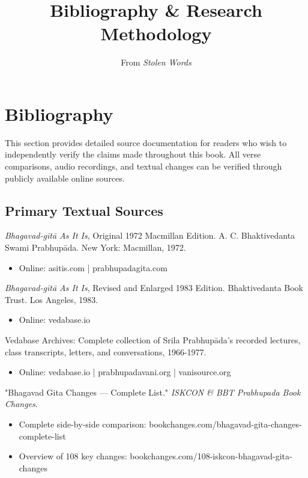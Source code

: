 \documentclass[12pt]{article}
\title{Bibliography \& Research Methodology}
\author{From \textit{Stolen Words}}
\date{}
\begin{document}
\maketitle

\section*{Bibliography}

This section provides detailed source documentation for readers who wish to independently verify the claims made throughout this book. All verse comparisons, audio recordings, and textual changes can be verified through publicly available online sources.

\vspace{0.5cm}

\subsection*{Primary Textual Sources}

\textit{Bhagavad-gītā As It Is}, Original 1972 Macmillan Edition. A. C. Bhaktivedanta Swami Prabhupāda. New York: Macmillan, 1972.
\begin{itemize}
\item Online: asitis.com | prabhupadagita.com
\end{itemize}

\textit{Bhagavad-gītā As It Is}, Revised and Enlarged 1983 Edition. Bhaktivedanta Book Trust. Los Angeles, 1983.
\begin{itemize}
\item Online: vedabase.io
\end{itemize}

Vedabase Archives: Complete collection of Srila Prabhupāda's recorded lectures, class transcripts, letters, and conversations, 1966-1977.
\begin{itemize}
\item Online: vedabase.io | prabhupadavani.org | vanisource.org
\end{itemize}

"Bhagavad Gita Changes — Complete List." \textit{ISKCON \& BBT Prabhupada Book Changes}.
\begin{itemize}
\item Complete side-by-side comparison: bookchanges.com/bhagavad-gita-changes-complete-list
\item Overview of 108 key changes: bookchanges.com/108-iskcon-bhagavad-gita-changes
\end{itemize}
\end{document}
